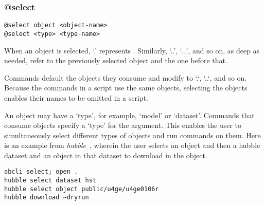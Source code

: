 \subsubsection{@select}
\label{select}

\begin{verbatim}
@select object <object-name>
@select <type> <type-name>
\end{verbatim}

When an object is selected, `.' represents . Similarly, `..', `...', and so on, as deep as needed, refer to the previously selected object and the one before that.

Commands default the objects they consume and modify to `.`, `..`, and so on. Because the commands in a script use the same objects, selecting the objects enables their names to be omitted in a script.

An object may have a `type', for example, `model' or `dataset'. Commands that consume objects specify a `type' for the argument. This enables the user to simultaneously select different types of objects and run commands on them. Here is an example from \emph{hubble}~, wherein the user selects an object and then a hubble dataset and an object in that dataset to download in the object.

\begin{verbatim}
abcli select; open .
hubble select dataset hst
hubble select object public/u4ge/u4ge0106r
hubble download ~dryrun
\end{verbatim}